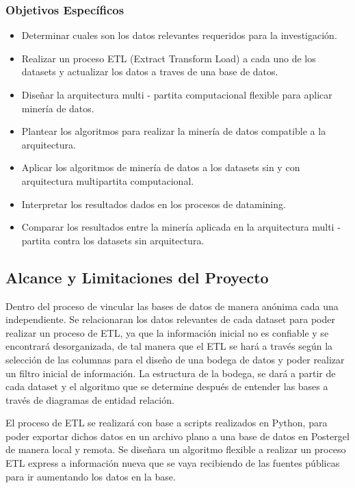 \documentclass[a4paper, 11pt, oneside]{article}
\theoremstyle{definition}
\theoremstyle{remark}
\begin{document}
\subsubsection{Objetivos Específicos}
\begin{itemize}
\item Determinar cuales son los datos relevantes requeridos para la investigación.
\item Realizar un proceso ETL (Extract Transform Load) a cada uno de los datasets y actualizar los datos a traves de una base de datos.
\item Diseñar la arquitectura multi - partita computacional flexible para aplicar minería de datos.
\item Plantear los algoritmos para realizar la minería de datos compatible a la arquitectura.
\item Aplicar los algoritmos de minería de datos a los datasets sin y con arquitectura multipartita computacional.
\item Interpretar los resultados dados en los procesos de datamining.
\item Comparar los resultados entre la minería aplicada en la arquitectura multi - partita contra los datasets sin arquitectura.

\end{itemize}

\subsection{Alcance y Limitaciones del Proyecto}

Dentro del proceso de vincular las bases de datos de manera anónima cada una independiente. Se relacionaran los datos relevantes de cada dataset para poder realizar un proceso de ETL, ya que la información inicial no es confiable y se encontrará desorganizada, de tal manera que el ETL se hará a través según la selección de las columnas para el diseño de una bodega de datos y poder realizar un filtro inicial de información. La estructura de la bodega, se dará a partir de cada dataset y el algoritmo que se determine después de entender las bases a través de diagramas de entidad relación.

El proceso de ETL se realizará con base a scripts realizados en Python, para poder exportar dichos datos en un archivo plano a una base de datos en Postergel de manera local y remota. Se diseñara un algoritmo flexible a realizar un proceso ETL express a información nueva que se vaya recibiendo de las fuentes públicas para ir aumentando los datos en la base.
\end{document}
